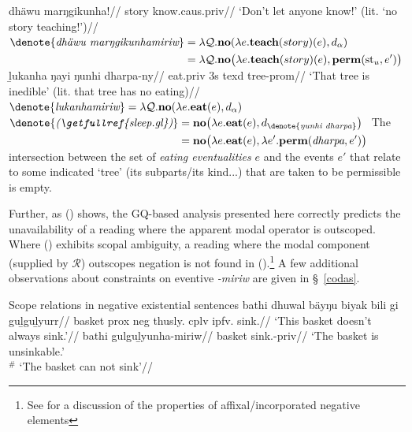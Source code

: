 \pex\a\begingl\gla dhäwu marŋgikunha!//
\glb story know.\gls{caus}.\IV\textdblhyphen\gls{priv}//
\glft`Don't let anyone know!' (lit. `no story teaching!')\trailingcitation{[AW~20190502]}//\endgl{}
	\a $\begin{aligned}[t]
		\denote{\textit{dhäwu marŋgikunhamiriw}}&=\lambda\mathcal Q.\textbf{no}(\lambda e.\textbf{teach}(story)(e),d_\alpha)\\
		&=\lambda\mathcal Q.\textbf{no}\big(\lambda e.\textbf{teach}(story)(e),\textbf{perm}(\mathrm{st}_u,e')\big)
\end{aligned} $
\xe
	\pex
	 \a\begingl\gla ḻukanha ŋayi ŋunhi dharpa-ny//
	\glb eat.\IV\textdblhyphen\gls{priv}  3s \gls{texd} tree-\gls{prom}//
	\glft`That tree is inedible' (lit. that tree has no eating)//\endgl
	\a $\denote{\textit{lukanhamiriw}}=\lambda\mathcal Q.\textbf{no}(\lambda e.\textbf{eat}(e),d_\alpha)$
	\a$ \begin{aligned}[t]
		\denote{\textit{(\getfullref{sleep.gl})}}&=\textbf{no}\big(\lambda e.\textbf{eat}(e),d_{\denote{\textit{ŋunhi~dharpa}}}\big)\\
		&=\textbf{no}\big(\lambda e.\textbf{eat}(e),\lambda e'.\textbf{perm}(\textit{dharpa},e')\big)
	\end{aligned} $
	\a The intersection between the set of \textit{eating eventualities} $ e $ and the events $ e' $ that relate to some indicated `tree' (its subparts/its kind...) that are taken to be permissible is empty.
	\xe
	
Further, as (\nextx) shows, the GQ-based analysis presented here correctly predicts the unavailability of a reading where the apparent modal operator is outscoped. Where () exhibits scopal ambiguity, a reading where the modal component (supplied by $ \mathcal R $) outscopes negation is not found in ().\footnote{See \citet[Ch. 5]{Horn2001} for a discussion of the properties of affixal/incorporated negative elements} A few additional observations about constraints on eventive \textit{-miriw} are given in \S~\ref{codas}.
	
	
	\pex Scope relations in negative existential sentences \trailingcitation{[AW~20190501]}
	\a\begingl\gla bathi dhuwal bäyŋu biyak bili gi guḻguḻyurr//
	\glb basket \gls{prox} \gls{neg} thusly.\II{} \gls{cplv} \gls{ipfv}.\II{} sink.\II{}//
	\glft`This basket doesn't always sink.'//\endgl
	\a\begingl\gla bathi gulguḻyunha-miriw//
	\glb  basket sink.\IV-\gls{priv}//
	\glft `The basket is unsinkable.'\trailingcitation{$ \neg\gg\square$} \\
	$ ^\# $ `The basket can not sink'\trailingcitation{$ *\square\gg\neg $}//\endgl{}
	
